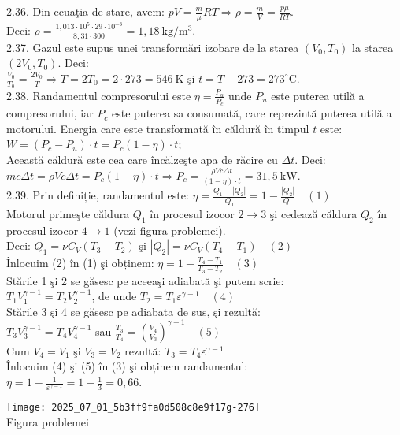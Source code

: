 2.36. Din ecuaţia de stare, avem: $p V=\frac{m}{\mu} R T \Rightarrow \rho=\frac{m}{V}=\frac{p \mu}{R T}$.\\ Deci: $\rho=\frac{1,013 \cdot 10^{5} \cdot 29 \cdot 10^{-3}}{8,31 \cdot 300}=1,18 \mathrm{~kg} / \mathrm{m}^{3}$.\\

2.37. Gazul este supus unei transformări izobare de la starea $\left(V_{0}, T_{0}\right)$ la starea $\left(2 V_{0}, T_{0}\right)$. Deci:\\ $\frac{V_{0}}{T_{0}}=\frac{2 V_{0}}{T} \Rightarrow T=2 T_{0}=2 \cdot 273=546 \mathrm{~K} \text { şi } t=T-273=273^{\circ} \mathrm{C}$.\\

2.38. Randamentul compresorului este $\eta=\frac{P_{u}}{P_{c}}$ unde $P_{u}$ este puterea utilă a compresorului, iar $P_{c}$ este puterea sa consumată, care reprezintă puterea utilă a motorului. Energia care este transformată în căldură în timpul $t$ este:\\ $W=\left(P_{c}-P_{u}\right) \cdot t=P_{c}(1-\eta) \cdot t$;\\ Această căldură este cea care încălzeşte apa de răcire cu $\Delta t$. Deci:\\ $m c \Delta t=\rho V c \Delta t=P_{c}(1-\eta) \cdot t \Rightarrow P_{c}=\frac{\rho V c \Delta t}{(1-\eta) \cdot t}=31,5 \mathrm{~kW}$.\\

2.39. Prin definiție, randamentul este: $\eta=\frac{Q_{1}-\left|Q_{2}\right|}{Q_{1}}=1-\frac{\left|Q_{2}\right|}{Q_{1}} \quad (1)$\\ Motorul primeşte căldura $Q_{1}$ în procesul izocor $2 \rightarrow 3$ şi cedează căldura $Q_{2}$ în procesul izocor $4 \rightarrow 1$ (vezi figura problemei).\\ Deci: $Q_{1}=\nu C_{V}\left(T_{3}-T_{2}\right)$ şi $\left|Q_{2}\right|=\nu C_{V}\left(T_{4}-T_{1}\right) \quad (2)$\\ Înlocuim (2) în (1) şi obținem: $\eta=1-\frac{T_{4}-T_{1}}{T_{3}-T_{2}} \quad (3)$\\ Stările 1 şi 2 se găsesc pe aceeaşi adiabată şi putem scrie:\\ $T_{1} V_{1}^{\gamma-1}=T_{2} V_{2}^{\gamma-1}$, de unde $T_{2}=T_{1} \varepsilon^{\gamma-1} \quad (4)$\\ Stările 3 şi 4 se găsesc pe adiabata de sus, şi rezultă:\\ $T_{3} V_{3}^{\gamma-1}=T_{4} V_{4}^{\gamma-1}$ sau $\frac{T_{3}}{T_{4}}=\left(\frac{V_{4}}{V_{3}}\right)^{\gamma-1} \quad (5)$\\ Cum $V_{4}=V_{1}$ şi $V_{3}=V_{2}$ rezultă: $T_{3}=T_{4} \varepsilon^{\gamma-1}$\\ Înlocuim (4) şi (5) în (3) şi obținem randamentul:\\ $\eta=1-\frac{1}{\varepsilon^{\gamma-1}}=1-\frac{1}{3}=0,66$.\\ \begin{center} \texttt{[image: 2025\_07\_01\_5b3ff9fa0d508c8e9f17g-276]}\\ Figura problemei \end{center}\\

